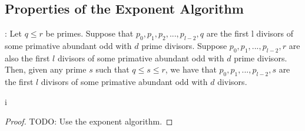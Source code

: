 \documentclass[../paper.tex]{subfiles}
\begin{document}
\subsection{Properties of the Exponent Algorithm}

\begin{theorem}[Property 1]

\end{theorem}

\begin{conj}:
Let $q \leq r$ be primes. Suppose that $p_0, p_1, p_2, ..., 
p_{l-2}, q$ are the first l divisors of some primative abundant
odd with $d$ prime divisors. Suppose $p_0, p_1, ..., p_{l-2},r$ 
are also the first $l$ divisors of some primative abundant odd
with $d$ prime divisors. Then, given any prime $s$ such that $q \leq s 
\leq r$, we have that $p_0, p_1,..., p_{l-2}, s$ are the first $l$
divisors of some primative abundant odd with $d$ divisors.
\end{conj}

i\begin{proof}
  TODO: Use the exponent algorithm.
\end{proof}













\end{document}
